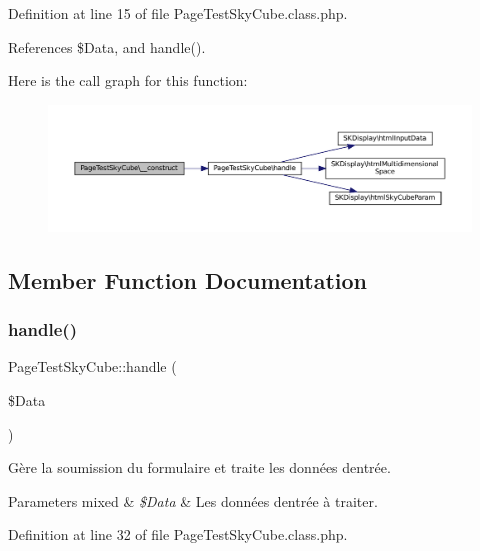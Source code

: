 Definition at line 15 of file Page\+Test\+Sky\+Cube.\+class.\+php.



References \$\+Data, and handle().

Here is the call graph for this function\+:\nopagebreak
\begin{figure}[H]
\begin{center}
\leavevmode
\includegraphics[width=350pt]{class_page_test_sky_cube_aa0f83f12c60b713d7e34da2596e30cdb_cgraph}
\end{center}
\end{figure}


\subsection{Member Function Documentation}
\mbox{\label{class_page_test_sky_cube_ae6489f90f41cdf80edb1b0b435e1c262}} 
\subsubsection{\texorpdfstring{handle()}{handle()}}
{\footnotesize\ttfamily Page\+Test\+Sky\+Cube\+::handle (\begin{DoxyParamCaption}\item[{}]{\$\+Data }\end{DoxyParamCaption})\hspace{0.3cm}{\ttfamily [protected]}}

Gère la soumission du formulaire et traite les données d\textquotesingle{}entrée.


\begin{DoxyParams}[1]{Parameters}
mixed & {\em \$\+Data} & Les données d\textquotesingle{}entrée à traiter. \\
\hline
\end{DoxyParams}


Definition at line 32 of file Page\+Test\+Sky\+Cube.\+class.\+php.




